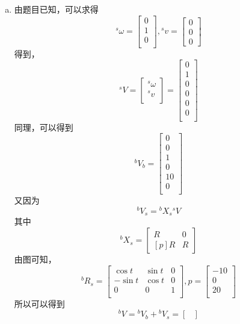 \begin{enumerate}[(a)]
    \item 
    由题目已知，可以求得\[^s\omega=\begin{bmatrix}
        0\\1\\0\\
    \end{bmatrix}, {}^sv = \begin{bmatrix}
        0\\0\\0 \end{bmatrix}\]
    得到，\[^sV=\begin{bmatrix}
        ^s\omega \\ ^sv\\
    \end{bmatrix} = \begin{bmatrix}
        0\\1\\0\\0\\0\\0\\
    \end{bmatrix}\]
    同理，可以得到\[{}^bV_b=\begin{bmatrix}
        0 \\ 0 \\ 1 \\ 0 \\ 10 \\ 0\\
    \end{bmatrix}\]
    又因为
    \[{}^bV_s={}^bX_s{}^sV\]其中\[{}^bX_s = \begin{bmatrix}
        R & 0 \\ [p]R & R
    \end{bmatrix}\]
    由图可知，\[{}^bR_s = \begin{bmatrix}
        \cos t & \sin t & 0 \\
        -\sin t & \cos t & 0 \\
        0 & 0 & 1\\
    \end{bmatrix}, p = \begin{bmatrix}
        -10 \\ 0 \\ 20 \\ 
    \end{bmatrix}\]
    所以可以得到\[{}^bV = {}^bV_b + {}^bV_s = \begin{bmatrix}

\end{bmatrix}\]
\end{enumerate}
